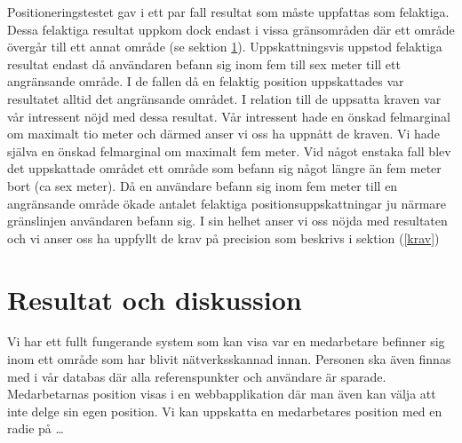\documentclass[swedish, a4paper,12pt]{article}
\begin{document}
Positioneringstestet gav i ett par fall resultat som måste uppfattas som felaktiga. Dessa felaktiga resultat uppkom dock endast i vissa gränsområden där ett område övergår till ett annat område (se sektion \ref{resultat}). Uppskattningsvis uppstod felaktiga resultat endast då användaren befann sig inom fem till sex meter till ett angränsande område. I de fallen då en felaktig position uppskattades var resultatet alltid det angränsande området. I relation till de uppsatta kraven var vår intressent nöjd med dessa resultat. Vår intressent hade en önskad felmarginal om maximalt tio meter och därmed anser vi oss ha uppnått de kraven. Vi hade själva en önskad felmarginal om maximalt fem meter. Vid något enstaka fall blev det uppskattade området ett område som befann sig något längre än fem meter bort (ca sex meter). Då en användare befann sig inom fem meter till en angränsande område ökade antalet felaktiga positionsuppskattningar ju närmare gränslinjen användaren befann sig. I sin helhet anser vi oss nöjda med resultaten och vi anser oss ha uppfyllt de krav på precision som beskrivs i sektion (\ref{krav})    %


\section{Resultat och diskussion}\label{resultat}

\iffalse
Vi har ett fullt fungerande system som kan visa var en medarbetare befinner sig inom ett område som har blivit nätverksskannad innan. Personen ska även finnas med i vår databas där alla referenspunkter och användare är sparade. Medarbetarnas position visas i en webbapplikation där man även kan välja att inte delge sin egen position. Vi kan uppskatta en medarbetares position med en radie på \ldots %
\end{document}
